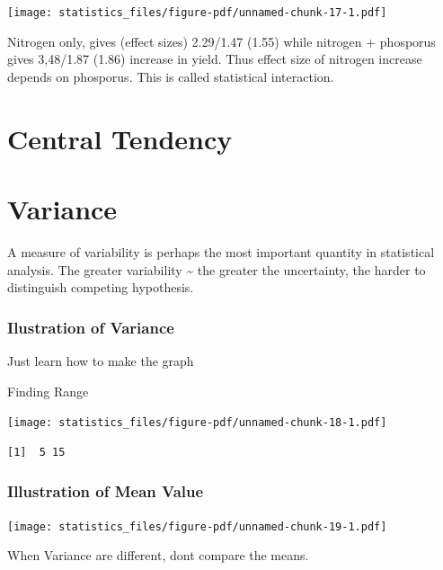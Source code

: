 \documentclass[
  letterpaper,
  DIV=11,
  numbers=noendperiod]{scrreprt}
\begin{document}
\texttt{[image: statistics\_files/figure-pdf/unnamed-chunk-17-1.pdf]}

Nitrogen only, gives (effect sizes) 2.29/1.47 (1.55) while nitrogen +
phosporus gives 3,48/1.87 (1.86) increase in yield. Thus effect size of
nitrogen increase depends on phosporus. This is called statistical
interaction.

\section*{Central Tendency}\label{central-tendency}


\section*{Variance}\label{variance}


A measure of variability is perhaps the most important quantity in
statistical analysis. The greater variability \textasciitilde{} the
greater the uncertainty, the harder to distinguish competing hypothesis.

\subsubsection*{Ilustration of Variance}\label{ilustration-of-variance}

Just learn how to make the graph

Finding Range

\texttt{[image: statistics\_files/figure-pdf/unnamed-chunk-18-1.pdf]}

\begin{verbatim}
[1]  5 15
\end{verbatim}

\subsubsection*{Illustration of Mean
Value}\label{illustration-of-mean-value}

\texttt{[image: statistics\_files/figure-pdf/unnamed-chunk-19-1.pdf]}

When Variance are different, dont compare the means.
\end{document}
